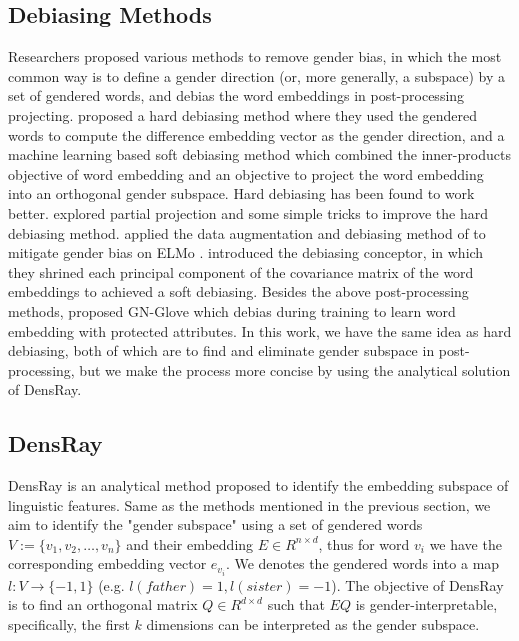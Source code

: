 \subsection{Debiasing Methods}
Researchers proposed various methods to remove gender bias, in which the most common way is to define a gender direction (or, more generally, a subspace) by a set of gendered words, and debias the word embeddings in post-processing projecting. \citet{bolukbasi2016man} proposed a hard debiasing method where they used the gendered words to compute the difference embedding vector as the gender direction, and a machine learning based soft debiasing method which combined the inner-products objective of word embedding and an objective to project the word embedding into an orthogonal gender subspace. Hard debiasing has been found to work better. \citet{dev2019attenuating} explored partial projection and some simple tricks to improve the hard debiasing method. \citet{zhao2019gender} applied the data augmentation and debiasing method of \citet{bolukbasi2016man} to mitigate gender bias on ELMo \citep{Peters:2018}. \citet{karve2019conceptor} introduced the debiasing conceptor, in which they shrined each principal component of the covariance matrix of the word embeddings to achieved a soft debiasing. Besides the above post-processing methods, \citep{zhao2018learning} proposed GN-Glove which debias during training to learn word embedding with protected attributes. In this work, we have the same idea as hard debiasing, both of which are to find and eliminate gender subspace in post-processing, but we make the process more concise by using the analytical solution of DensRay.

\subsection{DensRay}
DensRay is an analytical method proposed to identify the embedding subspace of linguistic features. Same as the methods mentioned in the previous section, we aim to identify the "gender subspace" using a set of gendered words $V:=\{v_1,v_2,\dots,v_n\}$ and their embedding $E \in R^{n\times d}$, thus for word $v_i$ we have the corresponding embedding vector $e_{v_i}$. We denotes the gendered words into a map $l:V\to \{-1,1\}$ (e.g. $l(father)=1,l(sister)=-1$). The objective of DensRay is to find an orthogonal matrix $Q\in R^{d\times d}$ such that $EQ$ is gender-interpretable, specifically, the first $k$ dimensions can be interpreted as the gender subspace.

